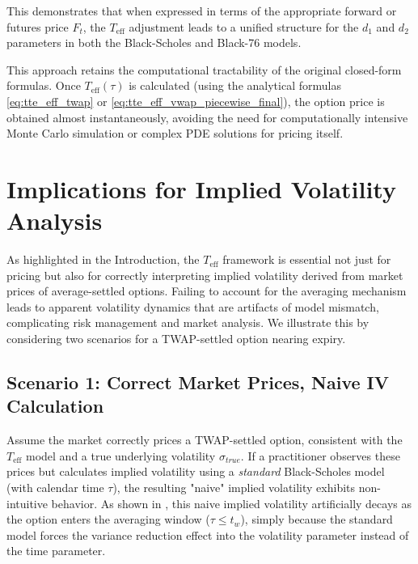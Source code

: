 \documentclass[11pt]{article}
\theoremstyle{plain}
\begin{document}
This demonstrates that when expressed in terms of the appropriate forward or futures price $F_t$, the $T_{\mathrm{eff}}$ adjustment leads to a unified structure for the $d_1$ and $d_2$ parameters in both the Black-Scholes and Black-76 models.

This approach retains the computational tractability of the original closed-form formulas. Once $T_{\mathrm{eff}}(\tau)$ is calculated (using the analytical formulas \cref{eq:tte_eff_twap} or \cref{eq:tte_eff_vwap_piecewise_final}), the option price is obtained almost instantaneously, avoiding the need for computationally intensive Monte Carlo simulation or complex PDE solutions for pricing itself.

\section{Implications for Implied Volatility Analysis}
\label{sec:implied_vol_implications}

As highlighted in the Introduction, the $T_{\mathrm{eff}}$ framework is essential not just for pricing but also for correctly interpreting implied volatility derived from market prices of average-settled options. Failing to account for the averaging mechanism leads to apparent volatility dynamics that are artifacts of model mismatch, complicating risk management and market analysis. We illustrate this by considering two scenarios for a TWAP-settled option nearing expiry.

\subsection{Scenario 1: Correct Market Prices, Naive IV Calculation}

Assume the market correctly prices a TWAP-settled option, consistent with the $T_{\mathrm{eff}}$ model and a true underlying volatility $\sigma_{true}$. If a practitioner observes these prices but calculates implied volatility using a \textit{standard} Black-Scholes model (with calendar time $\tau$), the resulting "naive" implied volatility exhibits non-intuitive behavior. As shown in , this naive implied volatility artificially decays as the option enters the averaging window ($\tau \le t_w$), simply because the standard model forces the variance reduction effect into the volatility parameter instead of the time parameter.
\end{document}
